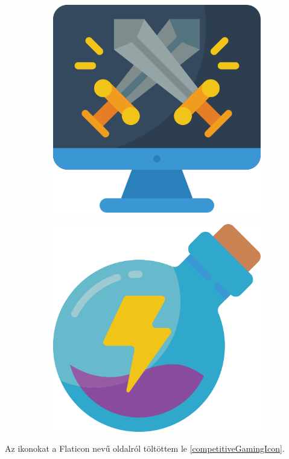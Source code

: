 \begin{figure}[h]
\begin{subfigure}{.1\textwidth}
        \includegraphics[width=.8\linewidth]{images/icons/057-computer.png}
    \end{subfigure}
    \begin{subfigure}{.1\textwidth}
        \centering
        \includegraphics[width=.8\linewidth]{images/icons/058-potion.png}
    \end{subfigure}
\end{figure}

Az ikonokat a Flaticon nevű oldalról töltöttem le \ref{competitiveGamingIcon}.

